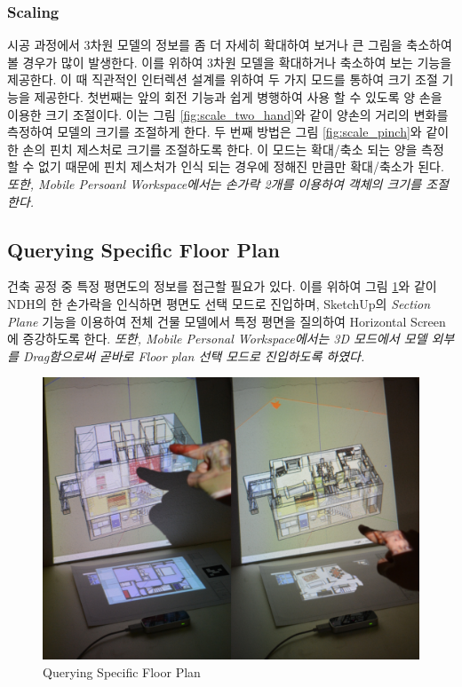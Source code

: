 \subsubsection{Scaling}
시공 과정에서 3차원 모델의 정보를 좀 더 자세히 확대하여 보거나 큰 그림을 축소하여 볼 경우가 많이 발생한다. 이를 위하여 3차원 모델을 확대하거나 축소하여 보는 기능을 제공한다. 이 때 직관적인 인터렉션 설계를 위하여 두 가지 모드를 통하여 크기 조절 기능을 제공한다. 첫번째는 앞의 회전 기능과 쉽게 병행하여 사용 할 수 있도록 양 손을 이용한 크기 조절이다. 이는 그림 \ref{fig:scale_two_hand}와 같이 양손의 거리의 변화를 측정하여 모델의 크기를 조절하게 한다. 두 번째 방법은 그림 \ref{fig:scale_pinch}와 같이 한 손의 핀치 제스처로 크기를 조절하도록 한다. 이 모드는 확대/축소 되는 양을 측정할 수 없기 때문에 핀치 제스처가 인식 되는 경우에 정해진 만큼만 확대/축소가 된다. \textit{또한, Mobile Persoanl Workspace에서는 손가락 2개를 이용하여 객체의 크기를 조절한다.}


\subsection{Querying Specific Floor Plan}
건축 공정 중 특정 평면도의 정보를 접근할 필요가 있다. 이를 위하여 그림 \ref{fig:layer}와 같이 NDH의 한 손가락을 인식하면 평면도 선택 모드로 진입하며, SketchUp의 \textit{Section Plane} 기능을 이용하여 전체 건물 모델에서 특정 평면을 질의하여 Horizontal Screen에 증강하도록 한다. \textit{또한, Mobile Personal Workspace에서는 3D 모드에서 모델 외부를 Drag함으로써 곧바로 Floor plan 선택 모드로 진입하도록 하였다.}
 \begin{figure}[h!]
\centering
\includegraphics[width=0.9\columnwidth]{4-Interaction_Design/query_plane}
\caption{Querying Specific Floor Plan}
\label{fig:layer}
\end{figure}


